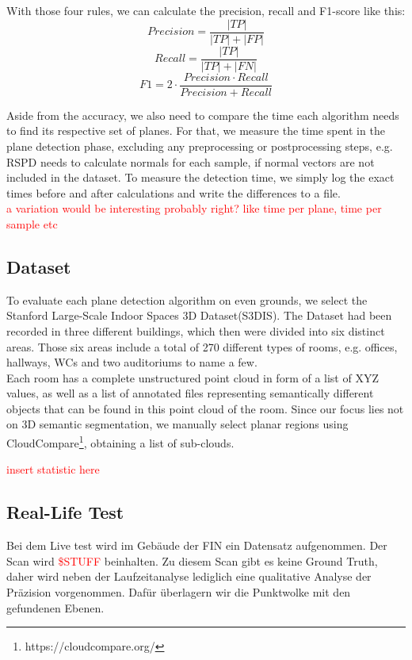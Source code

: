 \documentclass[main.tex]{subfiles}
\begin{document}
With those four rules, we can calculate the precision, recall and F1-score like this:
$$Precision = \frac{|TP|}{|TP|+|FP|}$$  
$$Recall = \frac{|TP|}{|TP|+|FN|}$$  
$$F1 = 2 \cdot\frac{Precision\cdot Recall}{Precision + Recall}$$  

Aside from the accuracy, we also need to compare the time each algorithm needs to find its respective set of planes.
For that, we measure the time spent in the plane detection phase, excluding any preprocessing or postprocessing steps, e.g. RSPD needs to calculate normals for each sample, 
if normal vectors are not included in the dataset. 
To measure the detection time, we simply log the exact times before and after calculations and write the differences to a file.\\
\textcolor{red}{a variation would be interesting probably right? like time per plane, time per sample etc}



\subsection{Dataset}
To evaluate each plane detection algorithm on even grounds, we select the Stanford Large-Scale Indoor Spaces 3D Dataset(S3DIS). The Dataset had been recorded in three different buildings, 
which then were divided into six distinct areas. Those six areas include a total of 270 different types of rooms, e.g. offices, hallways, WCs and two auditoriums to name a few.\\
Each room has a complete unstructured point cloud in form of a list of XYZ values, as well as a list of annotated files representing semantically different objects that can be found in this point cloud 
of the room. 
Since our focus lies not on 3D semantic segmentation, we manually select planar regions using CloudCompare\footnote{https://cloudcompare.org/}, obtaining a list of sub-clouds.

\textcolor{red}{insert statistic here}

\subsection{Real-Life Test}
Bei dem Live test wird im Gebäude der FIN ein Datensatz aufgenommen. Der Scan wird \textcolor{red}{\$STUFF} beinhalten.
Zu diesem Scan gibt es keine Ground Truth, daher wird neben der Laufzeitanalyse lediglich eine qualitative Analyse der
Präzision vorgenommen.
Dafür überlagern wir die Punktwolke mit den gefundenen Ebenen.
\end{document}
